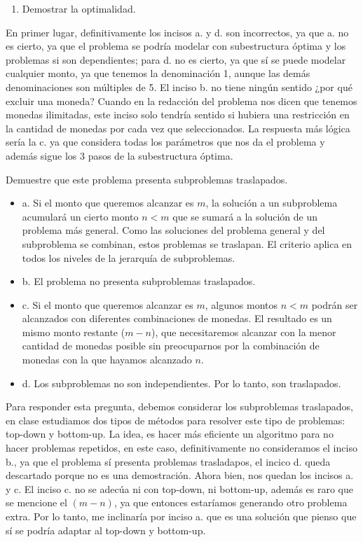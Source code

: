 \begin{problema}
\begin{sol}
\begin{enumerate}
            \item Demostrar la optimalidad. 
        \end{enumerate}
        En primer lugar, definitivamente los incisos a. y d. son incorrectos, ya que a. no es cierto, ya que el problema se podría modelar con subestructura óptima y los problemas si son dependientes; para d. no es cierto, ya que sí se puede modelar cualquier monto, ya que tenemos la denominación 1, aunque las demás denominaciones son múltiples de 5. El inciso b. no tiene ningún sentido ¿por qué excluir una moneda? Cuando en la redacción del problema nos dicen que tenemos monedas ilimitadas, este inciso solo tendría sentido si hubiera una restricción en la cantidad de monedas por cada vez que seleccionados. La respuesta más lógica sería la c. ya que considera todas los parámetros que nos da el problema y además sigue los 3 pasos de la subestructura óptima. 
    \end{sol}
\end{problema}

\begin{problema}
    Demuestre que este problema presenta subproblemas traslapados.
    \begin{itemize}
        \item a. Si el monto que queremos alcanzar es $m$, la solución a un subproblema acumulará un cierto
        monto $n < m$ que se sumará a la solución de un problema más general. Como las soluciones del problema general y del subproblema se combinan, estos problemas se traslapan. El criterio aplica en todos los niveles de la jerarquía de subproblemas.
        \item b. El problema no presenta subproblemas traslapados.
        \item c. Si el monto que queremos alcanzar es $m$, algunos montos $n < m$ podrán ser alcanzados
        con diferentes combinaciones de monedas. El resultado es un mismo monto restante ($m-n$), que necesitaremos alcanzar con la menor cantidad de monedas posible sin preocuparnos por la combinación de monedas con la que hayamos alcanzado $n$.
        \item d. Los subproblemas no son independientes. Por lo tanto, son traslapados.
    \end{itemize}
    \begin{sol}
        Para responder esta pregunta, debemos considerar los subproblemas traslapados, en clase estudiamos dos tipos de métodos para resolver este tipo de problemas: top-down y bottom-up. La idea, es hacer más eficiente un algoritmo para no hacer problemas repetidos, en este caso, definitivamente no consideramos el inciso b., ya que el problema sí presenta problemas trasladapos, el incico d. queda descartado porque no es una demostración. Ahora bien, nos quedan los incisos a. y c. El inciso c. no se adecúa ni con top-down, ni bottom-up, además es raro que se mencione el $(m-n)$, ya que entonces estaríamos generando otro problema extra. Por lo tanto, me inclinaría por inciso a. que es una solución que pienso que sí se podría adaptar al top-down y bottom-up. 
    \end{sol}
\end{problema}

